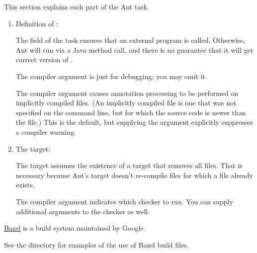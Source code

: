 
This section explains each part of the Ant task.

\begin{enumerate}
\item Definition of :

The  field of the  task
ensures that an external  program is called.  Otherwise, Ant will run
 via a Java method call, and there is no guarantee that it will get
correct version of .

The  compiler argument is just for debugging; you may omit
it.

The  compiler argument causes annotation processing
to be performed on implicitly compiled files.  (An implicitly compiled file
is one that was not specified on the command line, but for which the source
code is newer than the  file.)  This is the default, but
supplying the argument explicitly suppresses a compiler warning.


\item The  target:

The target assumes the existence of a  target that removes all
 files.  That is necessary because Ant's  target
doesn't re-compile  files for which a  file
already exists.

The  compiler argument indicates which checker to
run.  You can supply additional arguments to the checker as well.

\end{enumerate}



\href{https://bazel.build/}{Bazel} is a build system maintained by Google.

See the directory  for examples of the use of
Bazel build files.



